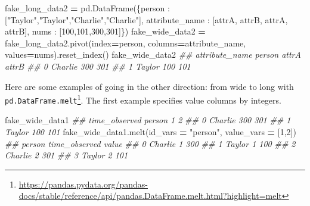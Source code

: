 \documentclass[
  12pt,
]{krantz}
\makeatletter
\newenvironment{Shaded}{\begin{snugshade}}{\end{snugshade}}
\newcommand{\CommentTok}[1]{\textcolor[rgb]{0.37,0.37,0.37}{\textit{#1}}}
\newcommand{\DecValTok}[1]{\textcolor[rgb]{0.06,0.06,0.06}{#1}}
\newcommand{\NormalTok}[1]{#1}
\newcommand{\OperatorTok}[1]{\textcolor[rgb]{0.43,0.43,0.43}{\textbf{#1}}}
\newcommand{\StringTok}[1]{\textcolor[rgb]{0.5,0.5,0.5}{#1}}
\renewcommand{\href}[2]{#2\footnote{\url{#1}}}
\newenvironment{kframe}{%
\medskip{}
\setlength{\fboxsep}{.8em}
 \def\at@end@of@kframe{}%
 \ifinner\ifhmode%
  \def\at@end@of@kframe{\end{minipage}}%
  \begin{minipage}{\columnwidth}%
 \fi\fi%
 \def\FrameCommand##1{\hskip\@totalleftmargin \hskip-\fboxsep
 \colorbox{shadecolor}{##1}\hskip-\fboxsep
     \hskip-\linewidth \hskip-\@totalleftmargin \hskip\columnwidth}%
 \MakeFramed {\advance\hsize-\width
   \@totalleftmargin\z@ \linewidth\hsize
   \@setminipage}}%
 {\par\unskip\endMakeFramed%
 \at@end@of@kframe}
\renewenvironment{Shaded}{\begin{kframe}}{\end{kframe}}
\makeatother
\begin{document}
\begin{Shaded}
\begin{Highlighting}[]
\NormalTok{fake\_long\_data2 }\OperatorTok{=}\NormalTok{ pd.DataFrame(\{}\StringTok{\textquotesingle{}person\textquotesingle{}}\NormalTok{ : [}\StringTok{"Taylor"}\NormalTok{,}\StringTok{"Taylor"}\NormalTok{,}\StringTok{"Charlie"}\NormalTok{,}\StringTok{"Charlie"}\NormalTok{], }
                               \StringTok{\textquotesingle{}attribute\_name\textquotesingle{}}\NormalTok{ : [}\StringTok{\textquotesingle{}attrA\textquotesingle{}}\NormalTok{, }\StringTok{\textquotesingle{}attrB\textquotesingle{}}\NormalTok{, }\StringTok{\textquotesingle{}attrA\textquotesingle{}}\NormalTok{, }\StringTok{\textquotesingle{}attrB\textquotesingle{}}\NormalTok{],}
                               \StringTok{\textquotesingle{}nums\textquotesingle{}}\NormalTok{ : [}\DecValTok{100}\NormalTok{,}\DecValTok{101}\NormalTok{,}\DecValTok{300}\NormalTok{,}\DecValTok{301}\NormalTok{]\})}
\NormalTok{fake\_wide\_data2 }\OperatorTok{=}\NormalTok{ fake\_long\_data2.pivot(index}\OperatorTok{=}\StringTok{\textquotesingle{}person\textquotesingle{}}\NormalTok{, }
\NormalTok{                                        columns}\OperatorTok{=}\StringTok{\textquotesingle{}attribute\_name\textquotesingle{}}\NormalTok{, }
\NormalTok{                                        values}\OperatorTok{=}\StringTok{\textquotesingle{}nums\textquotesingle{}}\NormalTok{).reset\_index()}
\NormalTok{fake\_wide\_data2}
\CommentTok{\#\# attribute\_name   person  attrA  attrB}
\CommentTok{\#\# 0               Charlie    300    301}
\CommentTok{\#\# 1                Taylor    100    101}
\end{Highlighting}
\end{Shaded}

Here are some examples of going in the other direction: from wide to long with \href{https://pandas.pydata.org/pandas-docs/stable/reference/api/pandas.DataFrame.melt.html?highlight=melt}{\texttt{pd.DataFrame.melt}}. The first example specifies value columns by integers.

\begin{Shaded}
\begin{Highlighting}[]
\NormalTok{fake\_wide\_data1}
\CommentTok{\#\# time\_observed   person    1    2}
\CommentTok{\#\# 0              Charlie  300  301}
\CommentTok{\#\# 1               Taylor  100  101}
\NormalTok{fake\_wide\_data1.melt(id\_vars }\OperatorTok{=} \StringTok{"person"}\NormalTok{, value\_vars }\OperatorTok{=}\NormalTok{ [}\DecValTok{1}\NormalTok{,}\DecValTok{2}\NormalTok{])}
\CommentTok{\#\#     person time\_observed  value}
\CommentTok{\#\# 0  Charlie             1    300}
\CommentTok{\#\# 1   Taylor             1    100}
\CommentTok{\#\# 2  Charlie             2    301}
\CommentTok{\#\# 3   Taylor             2    101}
\end{Highlighting}
\end{Shaded}
\end{document}
